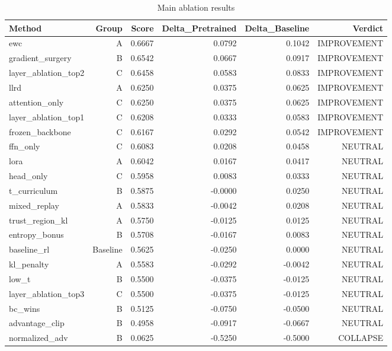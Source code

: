 \begin{table}[htbp]
\centering
\caption{Main ablation results}
\label{tab:main-results}
\begin{tabular}{lrrrrr}
\toprule
\textbf{Method} & \textbf{Group} & \textbf{Score} & \textbf{Delta\_Pretrained} & \textbf{Delta\_Baseline} & \textbf{Verdict} \\
\midrule
ewc & A & 0.6667 & 0.0792 & 0.1042 & IMPROVEMENT \\
gradient\_surgery & B & 0.6542 & 0.0667 & 0.0917 & IMPROVEMENT \\
layer\_ablation\_top2 & C & 0.6458 & 0.0583 & 0.0833 & IMPROVEMENT \\
llrd & A & 0.6250 & 0.0375 & 0.0625 & IMPROVEMENT \\
attention\_only & C & 0.6250 & 0.0375 & 0.0625 & IMPROVEMENT \\
layer\_ablation\_top1 & C & 0.6208 & 0.0333 & 0.0583 & IMPROVEMENT \\
frozen\_backbone & C & 0.6167 & 0.0292 & 0.0542 & IMPROVEMENT \\
ffn\_only & C & 0.6083 & 0.0208 & 0.0458 & NEUTRAL \\
lora & A & 0.6042 & 0.0167 & 0.0417 & NEUTRAL \\
head\_only & C & 0.5958 & 0.0083 & 0.0333 & NEUTRAL \\
t\_curriculum & B & 0.5875 & -0.0000 & 0.0250 & NEUTRAL \\
mixed\_replay & A & 0.5833 & -0.0042 & 0.0208 & NEUTRAL \\
trust\_region\_kl & A & 0.5750 & -0.0125 & 0.0125 & NEUTRAL \\
entropy\_bonus & B & 0.5708 & -0.0167 & 0.0083 & NEUTRAL \\
baseline\_rl & Baseline & 0.5625 & -0.0250 & 0.0000 & NEUTRAL \\
kl\_penalty & A & 0.5583 & -0.0292 & -0.0042 & NEUTRAL \\
low\_t & B & 0.5500 & -0.0375 & -0.0125 & NEUTRAL \\
layer\_ablation\_top3 & C & 0.5500 & -0.0375 & -0.0125 & NEUTRAL \\
bc\_wins & B & 0.5125 & -0.0750 & -0.0500 & NEUTRAL \\
advantage\_clip & B & 0.4958 & -0.0917 & -0.0667 & NEUTRAL \\
normalized\_adv & B & 0.0625 & -0.5250 & -0.5000 & COLLAPSE \\
\bottomrule
\end{tabular}
\end{table}